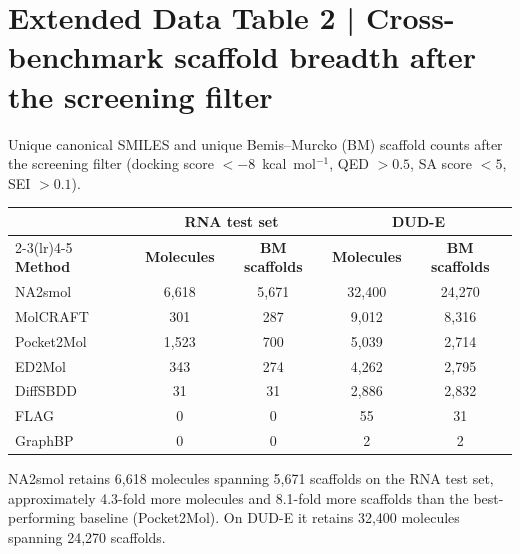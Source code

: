 \section*{Extended Data Table 2 | Cross-benchmark scaffold breadth after the screening filter}
Unique canonical SMILES and unique Bemis--Murcko (BM) scaffold counts after the screening filter (docking score $<-8$~kcal~mol$^{-1}$, QED $>0.5$, SA score $<5$, SEI $>0.1$).
\begin{center}\footnotesize
\setlength{\tabcolsep}{3.5pt}
\begin{tabular}{@{}lcccc@{}}
\toprule
 & \multicolumn{2}{c}{\textbf{RNA test set}} & \multicolumn{2}{c}{\textbf{DUD-E}} \\
\cmidrule(lr){2-3}\cmidrule(lr){4-5}
\textbf{Method} & \textbf{Molecules} & \textbf{BM scaffolds} & \textbf{Molecules} & \textbf{BM scaffolds} \\
\midrule
NA2smol    & 6,618 & 5,671 & 32,400 & 24,270 \\
MolCRAFT   &   301 &   287 &  9,012 &  8,316 \\
Pocket2Mol & 1,523 &   700 &  5,039 &  2,714 \\
ED2Mol     &   343 &   274 &  4,262 &  2,795 \\
DiffSBDD   &    31 &    31 &  2,886 &  2,832 \\
FLAG       &     0 &     0 &     55 &     31 \\
GraphBP    &     0 &     0 &      2 &      2 \\
\bottomrule
\end{tabular}\end{center}

NA2smol retains 6,618 molecules spanning 5,671 scaffolds on the RNA test set, approximately 4.3-fold more molecules and 8.1-fold more scaffolds than the best-performing baseline (Pocket2Mol). On DUD-E it retains 32,400 molecules spanning 24,270 scaffolds.
